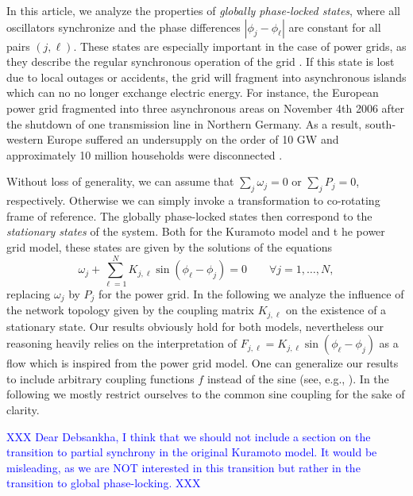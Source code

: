 \documentclass[10pt,aps,pre,preprint,superscriptaddress]{revtex4-1}
\newcommand{\dirk}[1]{\textcolor{blue}{#1}}
\newcommand{\be}{\begin{equation}}
\newcommand{\ee}{\end{equation}}
\begin{document}
In this article, we analyze the properties of \emph{globally phase-locked states},
where all oscillators synchronize and the phase differences $|\phi_j - \phi_\ell|$ 
are constant for all pairs $(j,\ell)$.  These states are especially important in the 
case of power grids, as they describe the regular synchronous operation of the grid
\cite{Berg81,Fila08,12powergrid,Mott13,Dorf13}.
If this state is lost due to local outages or accidents, the grid will fragment into
asynchronous islands which can no no longer exchange electric energy. 
For instance, the European power grid fragmented into three asynchronous 
areas on November 4th 2006 after the shutdown of one transmission line
in Northern Germany. As a result, south-western Europe suffered an undersupply 
on the order of 10 GW and approximately 10 million households were disconnected
\cite{UCTE07}.


Without loss of generality, we can assume that $\sum_j \omega_j = 0$ or 
$\sum_j P_j = 0$, respectively. Otherwise we can simply invoke a transformation
to co-rotating frame of reference.  The globally phase-locked states then correspond 
to the \emph{stationary states} of the system. Both for the Kuramoto model and t
he power grid model, these states are given by the solutions of the equations
\be
       \omega_j  + \sum_{\ell = 1}^N
      K _{j,\ell} \sin(\phi_\ell - \phi_j) =0 \qquad
     \forall j = 1,\ldots, N,
    \label{eqn:def-steady-state}
\ee
replacing $\omega_j$ by $P_j$ for the power grid.
In the following we analyze the influence of the network
topology given by the coupling matrix $K_{j,\ell}$ on the
existence of a stationary state. Our results obviously hold
for both models, nevertheless our reasoning heavily relies
on the interpretation of $F_{j,\ell}= K _{j,\ell} \sin(\phi_\ell - \phi_j)$
as a flow which is inspired from the power grid model. 
One can generalize our results to include arbitrary coupling
functions $f$ instead of the sine (see, e.g., \cite{Wata93,Bick11}). 
In the following we mostly restrict ourselves to the common 
sine coupling for the sake of clarity.

\dirk{XXX Dear Debsankha, I think that we should not include a section on the transition
to partial synchrony in the original Kuramoto model. It would be misleading, as we are NOT
interested in this transition but rather in the transition to global phase-locking. XXX}
\end{document}

